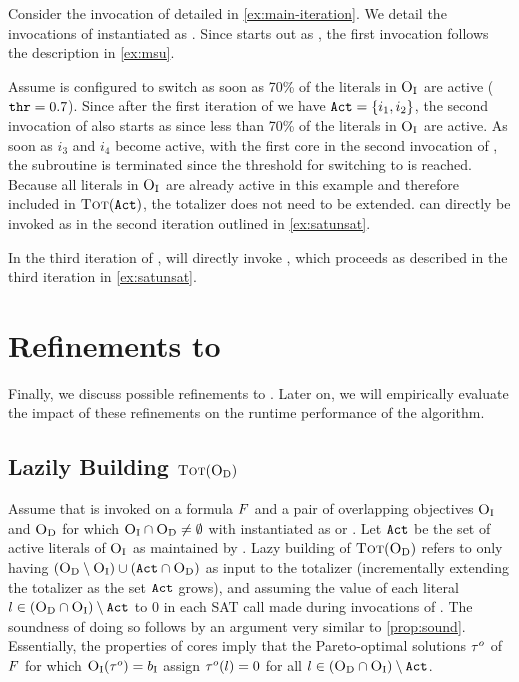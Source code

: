 \begin{example}
  Consider the invocation of \algname{} detailed in \cref{ex:main-iteration}.
  We detail the invocations of \Min{} instantiated as \msh{}.
  Since \msh{} starts out as \msu{}, the first invocation follows the description in \cref{ex:msu}.

  Assume \msh{} is configured to switch as soon as 70\% of the literals in $\textsc{O}_{\text{I}}$ are active ($\texttt{thr} = 0.7$).
  Since after the first iteration of \algname{} we have $\texttt{Act} = \{i_1, i_2\}$, the second invocation of \msh{} also starts as \msu{} since less than 70\% of the literals in $\textsc{O}_{\text{I}}$ are active.
  As soon as $i_3$ and $i_4$ become active, with the first core in the second invocation of \msu{}, the \msu{} subroutine is terminated since the threshold for switching to \satunsat{} is reached.
  Because all literals in $\textsc{O}_{\text{I}}$ are already active in this example and therefore included in $\textsc{Tot}(\texttt{Act})$, the totalizer does not need to be extended.
  \satunsat{} can directly be invoked as in the second iteration outlined in \cref{ex:satunsat}.

  In the third iteration of \algname{}, \msh{} will directly invoke \satunsat{}, which proceeds as described in the third iteration in \cref{ex:satunsat}.
\end{example}

\section{Refinements to \algname{}\label{sec:refinements}}

Finally, we discuss possible refinements to \algname{}.
Later on, we will empirically evaluate the impact of these refinements on the runtime performance of the algorithm.

\subsection{Lazily Building $\textsc{Tot}(\textsc{O}_{\text{D}})$}

Assume that \algname{} is invoked on a formula $F$ and a pair of overlapping objectives $\textsc{O}_{\text{I}}$ and $\textsc{O}_{\text{D}}$ for which $\textsc{O}_{\text{I}} \cap \textsc{O}_{\text{D}} \neq \emptyset$ with \Min{} instantiated as \msu{} or \oll{}.
Let $\texttt{Act}$ be the set of active literals of $\textsc{O}_{\text{I}}$ as maintained by \Min{}.
Lazy building of $\textsc{Tot}(\textsc{O}_{\text{D}})$ refers to only having $(\textsc{O}_{\text{D}} \setminus \textsc{O}_{\text{I}}) \cup  (\texttt{Act} \cap \textsc{O}_{\text{D}})$ as input to the totalizer (incrementally extending the totalizer as the set $\texttt{Act}$ grows), and assuming the value of each literal $l \in (\textsc{O}_{\text{D}} \cap \textsc{O}_{\text{I}}) \setminus \texttt{Act}$ to $0$ in each SAT call made during invocations of \Simpr{}.
The soundness of doing so follows by an argument very similar to \cref{prop:sound}.
Essentially, the properties of cores imply that the Pareto-optimal solutions $\tau^o$ of $F$ for which $\textsc{O}_{\text{I}}(\tau^o) = b_{\text{I}}$ assign $\tau^o(l) = 0$ for all  $l \in (\textsc{O}_{\text{D}} \cap \textsc{O}_{\text{I}}) \setminus \texttt{Act}$. 

